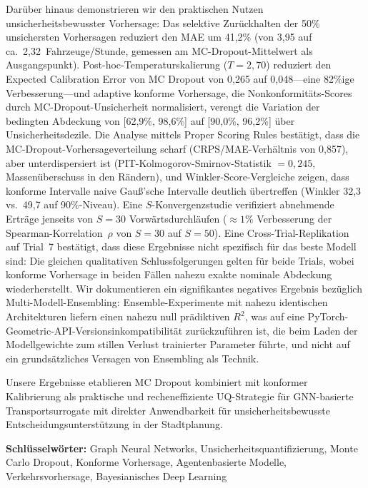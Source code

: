 Darüber hinaus demonstrieren wir den praktischen Nutzen unsicherheitsbewusster Vorhersage: Das selektive Zurückhalten der 50\% unsichersten Vorhersagen reduziert den MAE um 41,2\% (von 3,95 auf ca.\ 2,32~Fahrzeuge/Stunde, gemessen am MC-Dropout-Mittelwert als Ausgangspunkt). Post-hoc-Temperaturskalierung ($T = 2{,}70$) reduziert den Expected Calibration Error von MC Dropout von 0,265 auf 0,048---eine 82\%ige Verbesserung---und adaptive konforme Vorhersage, die Nonkonformitäts-Scores durch MC-Dropout-Unsicherheit normalisiert, verengt die Variation der bedingten Abdeckung von [62,9\%, 98,6\%] auf [90,0\%, 96,2\%] über Unsicherheitsdezile. Die Analyse mittels Proper Scoring Rules bestätigt, dass die MC-Dropout-Vorhersageverteilung scharf (CRPS/MAE-Verhältnis von 0,857), aber unterdispersiert ist (PIT-Kolmogorov-Smirnov-Statistik $= 0{,}245$, Massenüberschuss in den Rändern), und Winkler-Score-Vergleiche zeigen, dass konforme Intervalle naive Gauß'sche Intervalle deutlich übertreffen (Winkler 32,3 vs.\ 49,7 auf 90\%-Niveau). Eine $S$-Konvergenzstudie verifiziert abnehmende Erträge jenseits von $S = 30$ Vorwärtsdurchläufen ($\approx 1\%$ Verbesserung der Spearman-Korrelation~$\rho$ von $S = 30$ auf $S = 50$). Eine Cross-Trial-Replikation auf Trial~7 bestätigt, dass diese Ergebnisse nicht spezifisch für das beste Modell sind: Die gleichen qualitativen Schlussfolgerungen gelten für beide Trials, wobei konforme Vorhersage in beiden Fällen nahezu exakte nominale Abdeckung wiederherstellt. Wir dokumentieren ein signifikantes negatives Ergebnis bezüglich Multi-Modell-Ensembling: Ensemble-Experimente mit nahezu identischen Architekturen liefern einen nahezu null prädiktiven $R^2$, was auf eine PyTorch-Geometric-API-Versionsinkompatibilität zurückzuführen ist, die beim Laden der Modellgewichte zum stillen Verlust trainierter Parameter führte, und nicht auf ein grundsätzliches Versagen von Ensembling als Technik.

Unsere Ergebnisse etablieren MC Dropout kombiniert mit konformer Kalibrierung als praktische und recheneffiziente UQ-Strategie für GNN-basierte Transportsurrogate mit direkter Anwendbarkeit für unsicherheitsbewusste Entscheidungsunterstützung in der Stadtplanung.

\vspace{1cm}
\noindent\textbf{Schlüsselwörter:} Graph Neural Networks, Unsicherheitsquantifizierung, Monte Carlo Dropout, Konforme Vorhersage, Agentenbasierte Modelle, Verkehrsvorhersage, Bayesianisches Deep Learning
